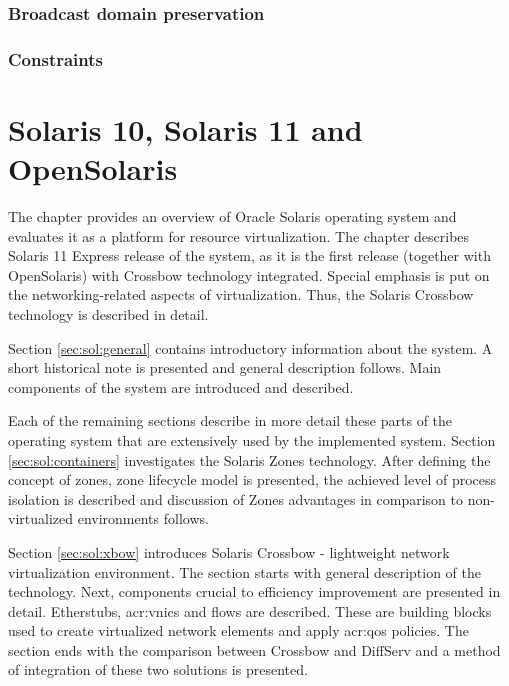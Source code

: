 \documentclass[11pt]{book}
\begin{document}
      \subsection{Broadcast domain preservation}

	  
		

      \subsection{Constraints}


  \chapter{Solaris 10, Solaris 11 and OpenSolaris}
  

    The chapter provides an overview of Oracle Solaris operating system and evaluates it as a platform for resource
    virtualization. The chapter describes Solaris 11 Express release of the system, as it is the first release (together
    with OpenSolaris) with Crossbow technology integrated. Special emphasis is put on the networking-related aspects of
    virtualization. Thus, the Solaris Crossbow technology is described in detail.

    Section \ref{sec:sol:general} contains introductory information about the system. A short historical note is
    presented and general description follows. Main components of the system are introduced and described.
    
    Each of the remaining sections describe in more detail these parts of the operating system that are extensively used
    by the implemented system. Section \ref{sec:sol:containers} investigates the Solaris Zones technology. After
    defining the concept of zones, zone lifecycle model is presented, the achieved level of process isolation is
    described and discussion of Zones advantages in comparison to non-virtualized environments follows.

    Section \ref{sec:sol:xbow} introduces Solaris Crossbow - lightweight network virtualization environment. The section
    starts with general description of the technology. Next, components crucial to efficiency improvement are presented
    in detail. Etherstubs, \gls{acr:vnic}s and flows are described. These are building blocks used to create virtualized network
    elements and apply \gls{acr:qos} policies. The section ends with the comparison between Crossbow and DiffServ and a
    method of integration of these two solutions is presented.
\end{document}
